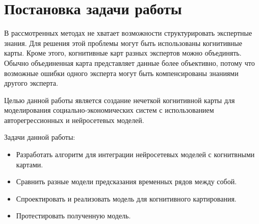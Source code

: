 \section{Постановка задачи работы}


В рассмотренных методах не хватает возможности структурировать экспертные знания.
Для решения этой проблемы могут быть использованы когнитивные карты.
Кроме этого, когнитивные карт разных экспертов можно объединять. Обычно
объединенная карта представляет данные более объективно, потому что возможные
ошибки одного эксперта могут быть компенсированы знаниями другого эксперта.

Целью данной работы является создание нечеткой когнитивной карты для моделирования
социально-экономических систем с использованием авторегрессионных и нейросетевых моделей.

Задачи данной работы:
\begin{itemize}
	\item Разработать алгоритм для интеграции нейросетевых моделей с когнитвными картами.
	\item Сравнить разные модели предсказания временных рядов между собой.
	\item Спроектировать и реализовать модель для когнитивного картирования.
	\item Протестировать полученную модель.
\end{itemize}

